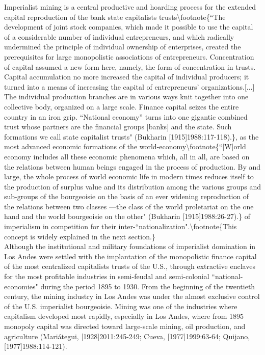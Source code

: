 \documentclass[
]{article}
\begin{document}
Imperialist mining is a central productive and hoarding process for the
extended capital reproduction of the bank state capitalists
trusts\textbackslash footnote\{``The development of joint stock
companies, which made it possible to use the capital of a considerable
number of individual entrepreneurs, and which radically undermined the
principle of individual ownership of enterprises, created the
prerequisites for large monopolistic associations of entrepreneurs.
Concentration of capital assumed a new form here, namely, the form of
concentration in trusts.\\
Capital accumulation no more increased the capital of individual
producers; it turned into a means of increasing the capital of
entrepreneurs' organizations.{[}...{]} The individual production
branches are in various ways knit together into one collective body,
organized on a large scale. Finance capital seizes the entire country in
an iron grip. ``National economy'' turns into one gigantic combined
trust whose partners are the financial groups {[}banks{]} and the state.
Such formations we call state capitalist trusts" (Bukharin
{[}1915{]}1988:117-118).\}, as the most advanced economic formations of
the world-economy\textbackslash footnote\{``{[}W{]}orld economy includes
all these economic phenomena which, all in all, are based on the
relations between human beings engaged in the process of production. By
and large, the whole process of world economic life in modern times
reduces itself to the production of surplus value and its distribution
among the various groups and sub-groups of the bourgeoisie on the basis
of an ever widening reproduction of the relations between two classes
---the class of the world proletariat on the one hand and the world
bourgeoisie on the other" (Bukharin {[}1915{]}1988:26-27).\} of
imperialism in competition for their
inter-``nationalization".\textbackslash footnote\{This concept is widely
explained in the next section.\}\\
Although the institutional and military foundations of imperialist
domination in Los Andes were settled with the implantation of the
monopolistic finance capital of the most centralized capitalists trusts
of the U.S., through extractive enclaves for the most profitable
industries in semi-feudal and semi-colonial ``national-economies" during
the period 1895 to 1930. From the beginning of the twentieth century,
the mining industry in Los Andes was under the almost exclusive control
of the U.S. imperialist bourgeoisie. Mining was one of the industries
where capitalism developed most rapidly, especially in Los Andes, where
from 1895 monopoly capital was directed toward large-scale mining, oil
production, and agriculture (Mariátegui, {[}1928{]}2011:245-249; Cueva,
{[}1977{]}1999:63-64; Quijano, {[}1977{]}1988:114-121).
\end{document}
